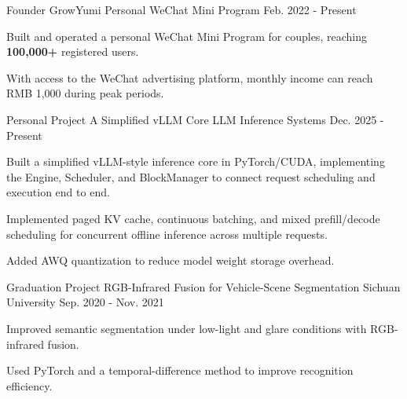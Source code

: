 

\begin{cventries}

  \cventry
    {Founder}
    {GrowYumi}
    {Personal WeChat Mini Program}
    {Feb. 2022 - Present}
    {
      \begin{cvitems}
        \item {Built and operated a personal WeChat Mini Program for couples, reaching \textbf{\textcolor{awesome-red}{100,000+}} registered users.}
        \item {With access to the WeChat advertising platform, monthly income can reach RMB 1,000 during peak periods.}
      \end{cvitems}
    }

  \cventry
    {Personal Project}
    {A Simplified vLLM Core}
    {LLM Inference Systems}
    {Dec. 2025 - Present}
    {
      \begin{cvitems}
        \item {Built a simplified vLLM-style inference core in PyTorch/CUDA, implementing the Engine, Scheduler, and BlockManager to connect request scheduling and execution end to end.}
        \item {Implemented paged KV cache, continuous batching, and mixed prefill/decode scheduling for concurrent offline inference across multiple requests.}
        \item {Added AWQ quantization to reduce model weight storage overhead.}
      \end{cvitems}
    }

  \cventry
    {Graduation Project}
    {RGB-Infrared Fusion for Vehicle-Scene Segmentation}
    {Sichuan University}
    {Sep. 2020 - Nov. 2021}
    {
      \begin{cvitems}
        \item {Improved semantic segmentation under low-light and glare conditions with RGB-infrared fusion.}
        \item {Used PyTorch and a temporal-difference method to improve recognition efficiency.}
      \end{cvitems}
    }

\end{cventries}
